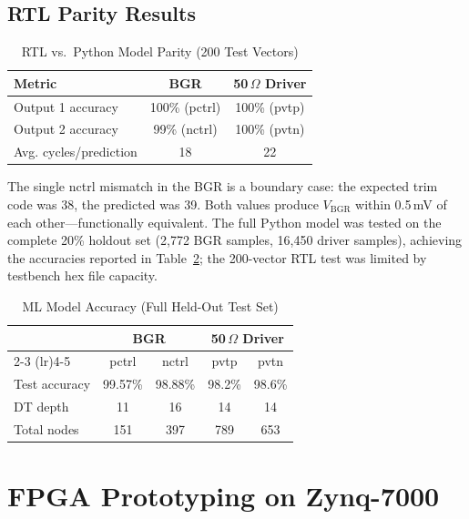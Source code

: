 \documentclass[lettersize,journal]{IEEEtran}
\begin{document}
\subsection{RTL Parity Results}

\begin{table}[!t]
\caption{RTL vs.\ Python Model Parity (200 Test Vectors)\label{tab:rtl}}
\centering
\begin{tabular}{lcc}
\toprule
\textbf{Metric} & \textbf{BGR} & \textbf{50\,$\Omega$ Driver} \\
\midrule
Output 1 accuracy & 100\% (pctrl) & 100\% (pvtp) \\
Output 2 accuracy & 99\% (nctrl) & 100\% (pvtn) \\
Avg. cycles/prediction & 18 & 22 \\
\bottomrule
\end{tabular}
\end{table}

The single nctrl mismatch in the BGR is a boundary case: the expected trim code was 38, the predicted was 39. Both values produce $V_{\text{BGR}}$ within 0.5\,mV of each other---functionally equivalent. The full Python model was tested on the complete 20\% holdout set (2,772 BGR samples, 16,450 driver samples), achieving the accuracies reported in Table~\ref{tab:ml_acc}; the 200-vector RTL test was limited by testbench hex file capacity.

\begin{table}[!t]
\caption{ML Model Accuracy (Full Held-Out Test Set)\label{tab:ml_acc}}
\centering
\begin{tabular}{lcccc}
\toprule
& \multicolumn{2}{c}{\textbf{BGR}} & \multicolumn{2}{c}{\textbf{50\,$\Omega$ Driver}} \\
\cmidrule(lr){2-3} \cmidrule(lr){4-5}
& pctrl & nctrl & pvtp & pvtn \\
\midrule
Test accuracy & 99.57\% & 98.88\% & 98.2\% & 98.6\% \\
DT depth & 11 & 16 & 14 & 14 \\
Total nodes & 151 & 397 & 789 & 653 \\
\bottomrule
\end{tabular}
\end{table}


\section{FPGA Prototyping on Zynq-7000}\label{sec:fpga}
\end{document}
